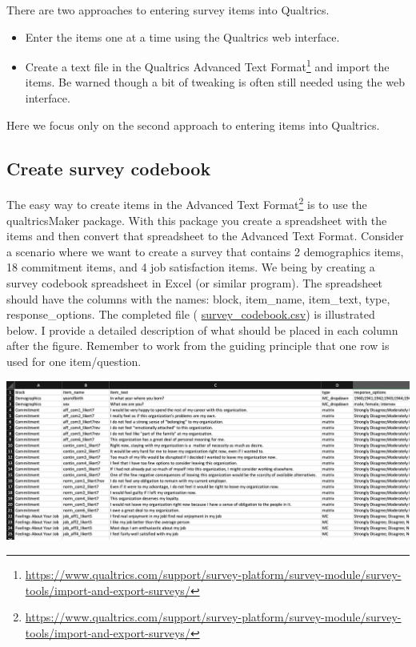 \documentclass[
]{krantz}
\renewcommand{\href}[2]{#2\footnote{\url{#1}}}
\begin{document}
There are two approaches to entering survey items into Qualtrics.

\begin{itemize}
\item
  Enter the items one at a time using the Qualtrics web interface.
\item
  Create a text file in the Qualtrics \href{https://www.qualtrics.com/support/survey-platform/survey-module/survey-tools/import-and-export-surveys/}{Advanced Text Format} and import the items. Be warned though a bit of tweaking is often still needed using the web interface.
\end{itemize}

Here we focus only on the second approach to entering items into Qualtrics.

\hypertarget{create-survey-codebook}{%
\subsection{Create survey codebook}\label{create-survey-codebook}}

The easy way to create items in the \href{https://www.qualtrics.com/support/survey-platform/survey-module/survey-tools/import-and-export-surveys/}{Advanced Text Format} is to use the qualtricsMaker package. With this package you create a spreadsheet with the items and then convert that spreadsheet to the Advanced Text Format. Consider a scenario where we want to create a survey that contains 2 demographics items, 18 commitment items, and 4 job satisfaction items. We being by creating a survey codebook spreadsheet in Excel (or similar program). The spreadsheet should have the columns with the names: block, item\_name, item\_text, type, response\_options. The completed file ( \url{survey_codebook.csv}) is illustrated below. I provide a detailed description of what should be placed in each column after the figure. Remember to work from the guiding principle that one row is used for one item/question.

\includegraphics[width=1\linewidth]{ch_qualtrics/images/screenshot_items}
\end{document}
